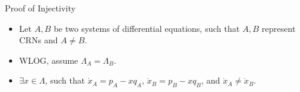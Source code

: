 \begin{frame}{Proof of Injectivity}
\begin{itemize}
\item Let $A, B$ be two systems of differential equations, such that $A, B$ represent CRNs and $A \neq B$.
\item WLOG, assume $\Lambda_{A} = \Lambda_{B}$.
\item $\exists x \in \Lambda$, such that $\dot{x}_{A} = p_{A} - xq_{A}$, $\dot{x}_{B} = p_{B} - xq_{B}$, and $\dot{x}_{A} \neq \dot{x}_{B}$.
\end{itemize}
\end{frame}
